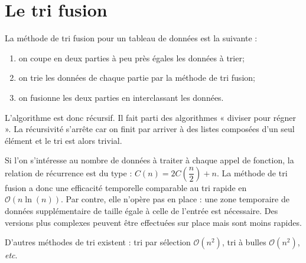 \documentclass[10pt,fleqn]{article} %
\begin{document}
\section{Le tri fusion}

La méthode de tri fusion pour un tableau de données est la suivante :
\begin{enumerate}
\item on coupe en deux parties à peu près égales les données à trier;
\item on trie les données de chaque partie par la méthode de tri fusion;
\item on fusionne les deux parties en interclassant les données.
\end{enumerate}

L'algorithme est donc récursif. Il fait parti des algorithmes « diviser pour régner ». La récursivité s'arrête car on finit par arriver à des listes composées d'un seul élément et le tri est alors trivial. 

Si l'on s'intéresse au nombre de données à traiter à chaque appel de fonction, la relation de récurrence est du type :
$C(n) = 2 C\left(\dfrac{n}{2}\right)  +  n$.
La méthode de tri fusion a donc une efficacité temporelle comparable au tri rapide en $\mathcal{O}\left(n \ln(n)\right)$. Par contre, elle n'opère pas en place : une zone temporaire de données supplémentaire de taille égale à celle de l'entrée est nécessaire. Des versions plus complexes peuvent être effectuées sur place mais sont moins rapides.

\begin{rem}
D'autres méthodes de tri existent : tri par sélection $\mathcal{O}\left(n^2\right)$, tri à bulles  $\mathcal{O}\left(n^2\right)$, \textit{etc}.
\end{rem}
\end{document}
